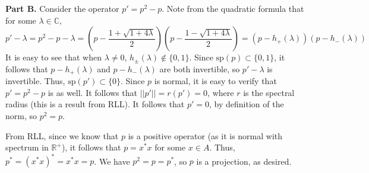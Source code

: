 \documentclass[aps,pra,showpacs,notitlepage,onecolumn,superscriptaddress,nofootinbib]{revtex4-1}
\newcommand{\hhrulefill}{\hspace{-1.0em}\hrulefill}
\theoremstyle{definition}
\newtheorem{lemma}{Lemma}[section]
\begin{document}
\noindent \textbf{Part B.} Consider the operator $p' = p^2 - p$. Note from the quadratic formula that for some $\lambda \in \mathbb{C}$,
\begin{equation}
  p' - \lambda = p^2 - p - \lambda = \left( p - \frac{1 + \sqrt{1 + 4\lambda}}{2}\right) \left( p - \frac{1 - \sqrt{1 + 4\lambda}}{2} \right) = (p - h_{+}(\lambda))(p - h_{-}(\lambda))
\end{equation}
It is easy to see that when $\lambda \neq 0$, $h_{\pm}(\lambda) \notin \{0, 1\}$. Since $\text{sp}(p) \subset \{0, 1\}$, it follows that $p - h_{+}(\lambda)$ and $p - h_{-}(\lambda)$ are both invertible,
so $p' - \lambda$ is invertible. Thus, $\text{sp}(p') \subset \{0\}$. Since $p$ is normal, it is easy to verify that $p' = p^2 - p$ is as well. It follows that $||p'|| = r(p') = 0$, where $r$ is the spectral radius (this
is a result from RLL). It follows that $p' = 0$, by definition of the norm, so $p^2 = p$.

From RLL, since we know that $p$ is a positive operator (as it is normal with spectrum in $\mathbb{R}^{+}$), it follows that $p = x^{*} x$ for some $x \in A$. Thus, $p^{*} = (x^{*} x)^{*} = x^{*} x = p$. We have $p^2 = p = p^{*}$, so
$p$ is a projection, as desired.
\newline

\begin{comment}

\hhrulefill

\noindent \emph{Before proceeding, let us make a brief interlude to present important results from RLL with some notation that we will make use of going forward.}

\begin{lemma}[The continuous function calculus]
\end{lemma}

\hhrulefill

\noindent \textbf{Part C.} We make use of the spectral mapping theorem. In particular, since $A$ is unital, $a$ is normal, and the $*$-isomorphism $\Phi$ taking $C(\text{sp}(a))$ to
$C^{*}(a, 1)$ will take polynomials $f$ on the spectrum to the corresponding polynomial of $a$, as well as the complex conjugate of an element of the spectrum to the conjugation operation on $a$,
if we define $g : \text{sp}(a) \rightarrow \mathbb{C}$ as $g(r) = \overline{r} r = g_1(r) \text{id}(r)$ where $g_1(r) = \overline{r}$, then $\Phi(g)(a) = (\Phi(g_1) \Phi(\text{id}))(a) = a^{*} a$,
as a map on $C^{*}(a, 1)$.

The spectral mapping theorem tells us that, since $g$ is a continuous map, we will have $g(\text{sp}(a)) = \text{sp}(\Phi(g)(a))$. In the case that $a = u$, $u^{*} u = 1$, so $\Phi(g)(u) = 1$. Evidently,
$\text{sp}(1) = \{1\}$, so $g(\text{sp}(u)) = \{1\}$. In other words, for every $r \in \text{sp}(u)$, $g(r) = |r|^2 = 1$, so by definition, $r \in \mathbb{T}$.

\end{comment}
\end{document}
